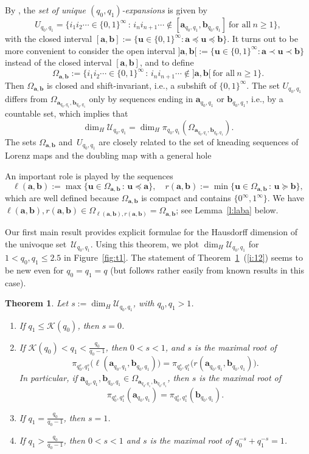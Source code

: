 \documentclass{amsart}
\newtheorem{theorem}{Theorem}[section]
\theoremstyle{definition}
\numberwithin{equation}{section}
\newcommand{\ba}{\mathbf{a}}
\newcommand{\bb}{\mathbf{b}}
\newcommand{\bu}{\mathbf{u}}
\newcommand{\cK}{\mathcal{K}}
\newcommand{\cU}{\mathcal{U}}
\begin{document}
By \cite{KomLuZou2022, KomSteZou2022}, the \emph{set of unique $(q_0,q_1)$-expansions} is given by
\[
U_{q_0,q_1} = \big\{i_1i_2\cdots \in \{0,1\}^\infty \,:\, i_ni_{n+1}\cdots \notin [\ba_{q_0,q_1},\bb_{q_0,q_1}]\ \text {for all}\ n \ge 1\big\},
\]
with the closed interval $[\ba,\bb] := \{\bu \in \{0,1\}^\infty : \ba \preceq \bu \preceq \bb\}$. 
It turns out to be more convenient to consider the open interval ${]\ba,\bb[} := \{\bu \in \{0,1\}^\infty : \ba \prec \bu \prec \bb\}$ instead of the closed interval $[\ba,\bb]$, and to define
\[
\Omega_{\ba,\bb} := \big\{i_1i_2\cdots \in \{0,1\}^\infty \,:\, i_ni_{n+1}\cdots \notin {]\ba,\bb[}\ \text {for all}\ n \ge 1\big\}.
\]
Then $\Omega_{\ba,\bb}$ is closed and shift-invariant, i.e., a subshift of $\{0,1\}^\infty$. 
The set $U_{q_0,q_1}$ differs from $\Omega_{\ba_{q_0, q_1},\bb_{q_0, q_1}}$ only by sequences ending in $\ba_{q_0,q_1}$ or $\bb_{q_0,q_1}$, i.e., by a countable set, which implies that
\[
\dim_H\cU_{q_0, q_1} = \dim_H \pi_{q_0, q_1}(\Omega_{\ba_{q_0, q_1},\bb_{q_0, q_1}}).
\]
The sets $\Omega_{\ba, \bb}$ and~$U_{q_0, q_1}$ are closely related to the set of kneading sequences of Lorenz maps and the doubling map with a general hole \cite{HubSpa1990, BarSteVin2014, GleSid2015}

An important role is played by the sequences 
\[
\ell(\ba,\bb) := \max \{\bu \in \Omega_{\ba,\bb} \,:\, \bu \preceq \ba\}, \quad r(\ba,\bb) := \min \{\bu \in \Omega_{\ba,\bb} \,:\, \bu \succeq \bb\},
\]
which are well defined because $\Omega_{\ba,\bb}$ is compact and contains $\{0^\infty,1^\infty\}$.
We have $\ell(\ba,\bb), r(\ba,\bb) \in \Omega_{\ell(\ba,\bb),r(\ba,\bb)} = \Omega_{\ba,\bb}$; see Lemma~\ref{l:laba} below.

Our first main result provides explicit formulae for the Hausdorff dimension of the univoque set~$\cU_{q_0,q_1}$.
Using this theorem, we plot $\dim_H \cU_{q_0,q_1}$ for $1 < q_0,q_1 \le 2.5$ in Figure~\ref{fig:t1}.
The statement of Theorem~\ref{t:t1}~(\ref{i:12}) seems to be new even for $q_0 = q_1 = q$ (but follows rather easily from known results in this case). 

\begin{theorem}\label{t:t1}
Let $s := \dim_H \cU_{q_0, q_1}$, with $q_0,q_1 > 1$.
\begin{enumerate}[\upshape (i)]
\itemsep1ex
\item \label{i:11}
If $q_1 \le \cK(q_0)$, then $s = 0$.
\item \label{i:12}
If $\cK(q_0) < q_1 < \frac{q_0}{q_0-1}$, then $0< s < 1$, and $s$ is the maximal root of 
\[
\pi_{q_0^s,q_1^s}\big(\ell(\ba_{q_0,q_1},\bb_{q_0,q_1})\big) = \pi_{q_0^s,q_1^s}\big(r(\ba_{q_0,q_1},\bb_{q_0,q_1})\big).
\]
In particular, if $\ba_{q_0, q_1}, \bb_{q_0, q_1} \in \Omega_{\ba_{q_0, q_1},\bb_{q_0, q_1}}$, then $s$ is the maximal root of 
\[
\pi_{q_0^s,q_1^s}(\ba_{q_0, q_1}) = \pi_{q_0^s,q_1^s}(\bb_{q_0, q_1}).
\]
\item \label{i:13}
If $q_1 = \frac{q_0}{q_0-1}$, then $s = 1$. 
\item \label{i:14}
If $q_1 > \frac{q_0}{q_0-1}$, then $0 < s < 1$ and $s$ is the maximal root of $q_0^{-s} {+} q_1^{-s} = 1$. 
\end{enumerate}
\end{theorem}
\end{document}
